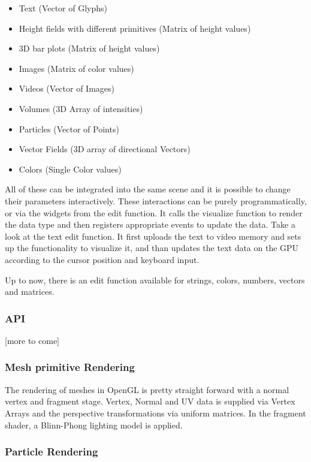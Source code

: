 \begin{itemize}
    \item Text (Vector of Glyphs)
    \item Height fields with different primitives (Matrix of height values)
    \item 3D bar plots (Matrix of height values)
    \item Images (Matrix of color values)
    \item Videos (Vector of Images)
    \item Volumes (3D Array of intensities)
    \item Particles (Vector of Points)
    \item Vector Fields (3D array of directional Vectors)
    \item Colors (Single Color values)
\end{itemize}

All of these can be integrated into the same scene and it is possible to change their parameters interactively.
These interactions can be purely programmatically, or via the widgets from the edit function.
It calls the visualize function to render the data type and then registers appropriate events to update the data.
Take a look at the text edit function.
It first uploads the text to video memory and sets up the functionality to visualize it, and than updates the text data on the GPU according to the cursor position and keyboard input.

Up to now, there is an edit function available for strings, colors, numbers, vectors and matrices.

\subsubsection{API}

[more to come]
\subsubsection{Mesh primitive Rendering}

The rendering of meshes in OpenGL is pretty straight forward with a normal vertex and fragment stage.
Vertex, Normal and UV data is supplied via Vertex Arrays and the perspective transformations via uniform matrices.
In the fragment shader, a Blinn-Phong lighting model is applied.

\subsubsection{Particle Rendering}

